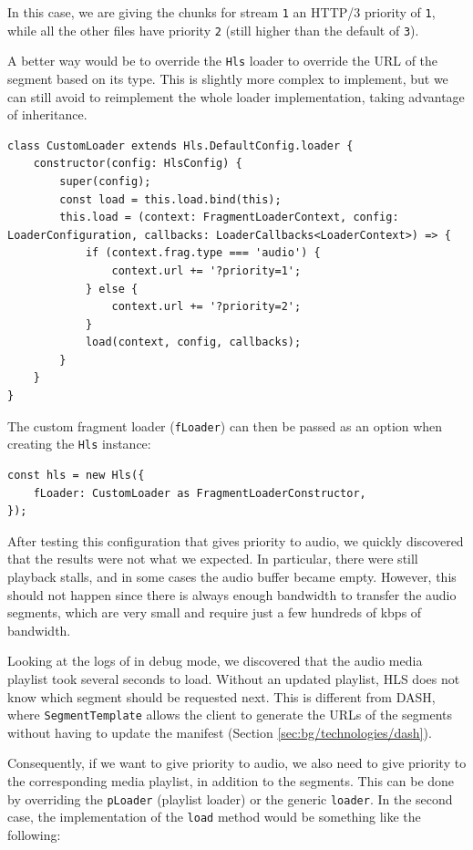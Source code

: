 In this case, we are giving the chunks for stream \texttt{1} an HTTP/3 priority of \texttt{1}, while all the other files have priority \texttt{2} (still higher than the default of \texttt{3}).

A better way would be to override the \texttt{Hls} loader to override the URL of the segment based on its type. This is slightly more complex to implement, but we can still avoid to reimplement the whole loader implementation, taking advantage of inheritance.

\begin{verbatim}
class CustomLoader extends Hls.DefaultConfig.loader {
    constructor(config: HlsConfig) {
        super(config);
        const load = this.load.bind(this);
        this.load = (context: FragmentLoaderContext, config: LoaderConfiguration, callbacks: LoaderCallbacks<LoaderContext>) => {
            if (context.frag.type === 'audio') {
                context.url += '?priority=1';
            } else {
                context.url += '?priority=2';
            }
            load(context, config, callbacks);
        }
    }
}
\end{verbatim}

The custom fragment loader (\texttt{fLoader}) can then be passed as an option when creating the \texttt{Hls} instance:

\begin{verbatim}
const hls = new Hls({
    fLoader: CustomLoader as FragmentLoaderConstructor,
});
\end{verbatim}

After testing this configuration that gives priority to audio, we quickly discovered that the results were not what we expected. In particular, there were still playback stalls, and in some cases the audio buffer became empty. However, this should not happen since there is always enough bandwidth to transfer the audio segments, which are very small and require just a few hundreds of kbps of bandwidth.

Looking at the logs of \hlsjs{} in debug mode, we discovered that the audio media playlist took several seconds to load. Without an updated playlist, HLS does not know which segment should be requested next. This is different from DASH, where \texttt{SegmentTemplate} allows the client to generate the URLs of the segments without having to update the manifest (Section \ref{sec:bg/technologies/dash}).

Consequently, if we want to give priority to audio, we also need to give priority to the corresponding media playlist, in addition to the segments. This can be done by overriding the \texttt{pLoader} (playlist loader) or the generic \texttt{loader}. In the second case, the implementation of the \texttt{load} method would be something like the following:

